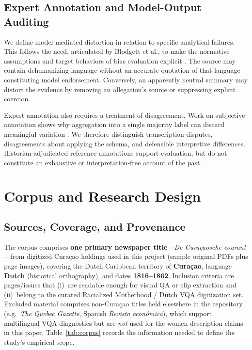 \documentclass[sigconf]{acmart}
\begin{document}
\subsection{Expert Annotation and Model-Output Auditing}

We define model-mediated distortion in relation to specific analytical failures. This follows the need, articulated by Blodgett et al., to make the normative assumptions and target behaviors of bias evaluation explicit \citep{blodgett2020language}. The source may contain dehumanizing language without an accurate quotation of that language constituting model endorsement. Conversely, an apparently neutral summary may distort the evidence by removing an allegation's source or suppressing explicit coercion.

Expert annotation also requires a treatment of disagreement. Work on subjective annotation shows why aggregation into a single majority label can discard meaningful variation \citep{davani2022dealing}. We therefore distinguish transcription disputes, disagreements about applying the schema, and defensible interpretive differences. Historian-adjudicated reference annotations support evaluation, but do not constitute an exhaustive or interpretation-free account of the past.

\section{Corpus and Research Design}
\label{sec:corpus}

\subsection{Sources, Coverage, and Provenance}

The corpus comprises \textbf{one primary newspaper title}---\textit{De Cura\c{c}aosche courant}---from digitized Cura\c{c}ao holdings used in this project (sample original PDFs plus page images), covering the Dutch Caribbean territory of \textbf{Cura\c{c}ao}, language \textbf{Dutch} (historical orthography), and dates \textbf{1816--1862}. Inclusion criteria are pages/issues that (i)~are readable enough for visual QA or clip extraction and (ii)~belong to the curated Racialized Motherhood / Dutch VQA digitization set. Excluded material comprises non-Cura\c{c}ao titles held elsewhere in the repository (e.g.\ \textit{The Quebec Gazette}, Spanish \textit{Revista econ\'{o}mica}), which support multilingual VQA diagnostics but are \emph{not} used for the women-description claims in this paper. Table~\ref{tab:corpus} records the information needed to define the study's empirical scope.
\end{document}
